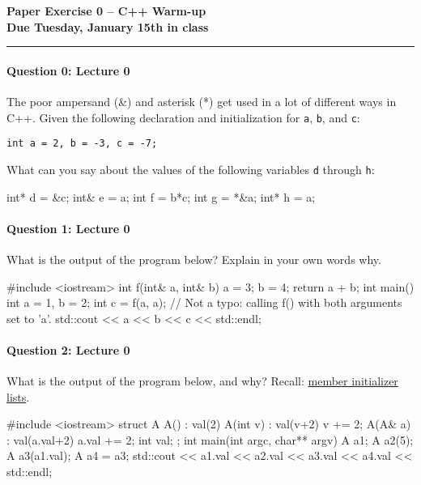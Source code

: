 \documentclass[12pt,letterpaper,twoside]{article}
\begin{document}
{\centering \textbf{Paper Exercise 0 -- C++ Warm-up\\ Due Tuesday, January 15th in class} \par}
\vspace*{-8pt}\noindent\rule{\linewidth}{1pt}

\paragraph{Question 0: Lecture 0} The poor ampersand (\&) and asterisk (*) get used in a lot of different ways in C++. Given the following declaration and initialization for {\tt a}, {\tt b}, and {\tt c}:
\begin{verbatim}
int a = 2, b = -3, c = -7;
\end{verbatim}
\vspace{-1ex}
What can you say about the values of the following variables {\tt d} through {\tt h}:
{\small
\begin{cpp}
int* d = &c;
int& e = a;
int f  = b*c;
int g  = *&a;
int* h = a;
\end{cpp}
}


\vspace{-2ex}
\paragraph{Question 1: Lecture 0} What is the output of the program below? Explain in your own words why.
\begin{cpp}
#include <iostream>
int f(int& a, int& b) {
  a = 3;
  b = 4;
  return a + b;
}
int main() {
  int a = 1, b = 2;
  int c = f(a, a);  // Not a typo: calling f() with both arguments set to 'a'.
  std::cout << a << b << c << std::endl;
}
\end{cpp}


\vspace{-2ex}
\paragraph{Question 2: Lecture 0} What is the output of the program below, and why?  Recall: \href{https://en.cppreference.com/w/cpp/language/initializer_list}{member initializer lists}.
{\small
\begin{cpp}
#include <iostream>
struct A {
  A() : val(2) {}
  A(int v) : val(v+2) { v += 2; }
  A(A& a) : val(a.val+2) { a.val += 2; } 
  int val;
};
int main(int argc, char** argv) {
  A a1;
  A a2(5);
  A a3(a1.val);
  A a4 = a3;  
  std::cout << a1.val << a2.val << a3.val << a4.val << std::endl;
}
\end{cpp}
}
\end{document}
